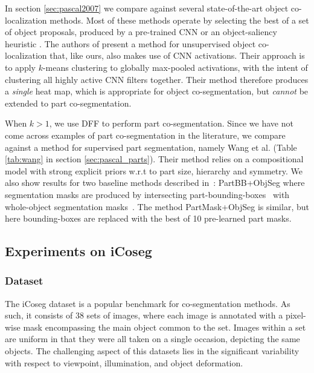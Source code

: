\documentclass[runningheads]{llncs}
\begin{document}
	In section \ref{sec:pascal2007} we compare against several state-of-the-art object co-localization methods.
	Most of these methods operate by selecting the best of a set of object proposals, produced by a pre-trained CNN \cite{li2016image} or an object-saliency heuristic \cite{cho2015,joulin2014}.
	The authors of \cite{le2017co} present a method for unsupervised object co-localization that, like ours, also makes use of CNN activations. Their approach is to apply $k$-means clustering to globally max-pooled activations, with the intent of clustering all highly active CNN filters together. Their method therefore produces a \emph{single} heat map, which is appropriate for object co-segmentation, but \emph{cannot} be extended to part co-segmentation.
	
	When  $k>1$, we use DFF to perform part co-segmentation. Since we have not come across examples of part co-segmentation in the literature, we compare against a method for supervised part segmentation, namely Wang et al. \cite{wang2015semantic} (Table \ref{tab:wang} in section \ref{sec:pascal_parts}).  Their method relies on a compositional model with strong explicit priors w.r.t to part size, hierarchy and symmetry. We also show results for two baseline methods described in~\cite{wang2015semantic}: PartBB+ObjSeg where segmentation masks are produced by intersecting part-bounding-boxes~\cite{Chen2014} with whole-object segmentation masks~\cite{BharathECCV2014}. The method PartMask+ObjSeg is similar, but here bounding-boxes are replaced with the best of 10 pre-learned part masks.
	
	
	
	\subsection{Experiments on iCoseg} \label{sec:icoseg}
	
	\subsubsection{Dataset}
	The iCoseg dataset \cite{batra2010icoseg} is a popular benchmark for co-segmentation methods. As such, it consists of 38 sets of images, where each image is annotated with a pixel-wise mask encompassing the main object common to the set.
	Images within a set are uniform in that they were all taken on a single occasion, depicting the same objects. The challenging aspect of this datasets lies in the significant variability with respect to viewpoint, illumination, and object deformation.
	
\end{document}

